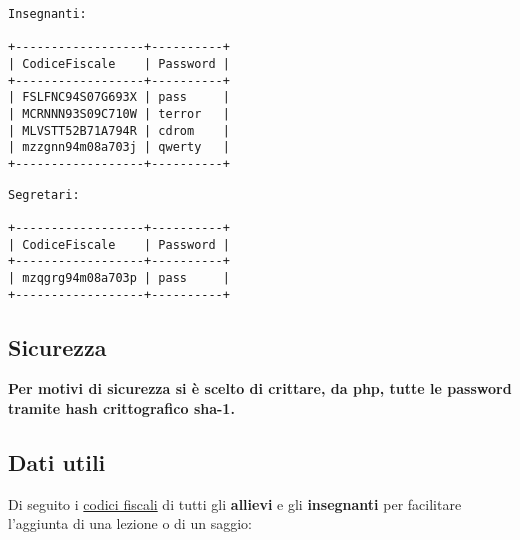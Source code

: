 \documentclass{article}
\begin{document}
\bigskip

\begin{verbatim}
Insegnanti:

+------------------+----------+   
| CodiceFiscale    | Password |
+------------------+----------+
| FSLFNC94S07G693X | pass     |
| MCRNNN93S09C710W | terror   |
| MLVSTT52B71A794R | cdrom    |
| mzzgnn94m08a703j | qwerty   |
+------------------+----------+
\end{verbatim}

\medskip

\begin{verbatim}
Segretari:

+------------------+----------+
| CodiceFiscale    | Password |
+------------------+----------+
| mzqgrg94m08a703p | pass     |
+------------------+----------+

\end{verbatim}

\subsection{Sicurezza}

\textbf{Per motivi di sicurezza si è scelto di crittare, da php, tutte le password tramite hash crittografico sha-1.} 

\bigskip

\subsection{Dati utili}

Di seguito i \underline{codici fiscali} di tutti gli \textbf{allievi} e gli \textbf{insegnanti} per facilitare l'aggiunta di una lezione o di un saggio:

\medskip

\begin{parcolumns}{3}
\end{parcolumns}
\end{document}
